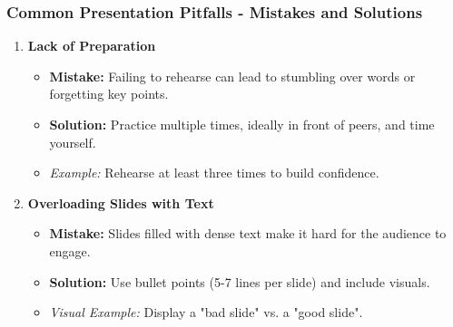 \documentclass[aspectratio=169]{beamer}
\begin{document}
\begin{frame}[fragile]
    \frametitle{Common Presentation Pitfalls - Mistakes and Solutions}
    \begin{enumerate}
        \item \textbf{Lack of Preparation}
        \begin{itemize}
            \item \textbf{Mistake:} Failing to rehearse can lead to stumbling over words or forgetting key points.
            \item \textbf{Solution:} Practice multiple times, ideally in front of peers, and time yourself.
            \item \textit{Example:} Rehearse at least three times to build confidence.
        \end{itemize}

        \item \textbf{Overloading Slides with Text}
        \begin{itemize}
            \item \textbf{Mistake:} Slides filled with dense text make it hard for the audience to engage.
            \item \textbf{Solution:} Use bullet points (5-7 lines per slide) and include visuals.
            \item \textit{Visual Example:} Display a "bad slide" vs. a "good slide".
        \end{itemize}
    \end{enumerate}
\end{frame}
\end{document}
